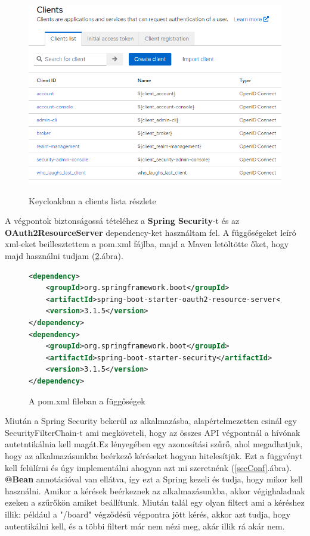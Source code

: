 \documentclass[a4paper,twoside]{article}
\begin{document}
\begin{figure}
	\caption{Keycloakban a clients lista részlete}
	\centering
	\includegraphics[scale=0.5]{keycloak-cients}
	\label{keycloak}
\end{figure}
\FloatBarrier


A végpontok biztonságossá tételéhez a \textbf{Spring Security}-t és az \\ \textbf{OAuth2ResourceServer} dependency-ket használtam fel. A függőségeket leíró xml-eket beillesztettem a pom.xml fájlba, majd a Maven letöltötte őket, hogy majd használni tudjam (\ref{pom}.ábra).
\begin{figure}
	\caption{A pom.xml fileban a függőségek}
	\centering
	\begin{lstlisting}[language=XML,breaklines=true]
<dependency>
	<groupId>org.springframework.boot</groupId>
	<artifactId>spring-boot-starter-oauth2-resource-server</artifactId>
	<version>3.1.5</version>
</dependency>
<dependency>
	<groupId>org.springframework.boot</groupId>
	<artifactId>spring-boot-starter-security</artifactId>
	<version>3.1.5</version>
</dependency>
	\end{lstlisting}
	\label{pom}
\end{figure}
\FloatBarrier


Miután a Spring Security bekerül az alkalmazásba, alapértelmezetten csinál egy SecurityFilterChain-t ami megköveteli, hogy az összes API végpontnál
a hívónak autetntikálnia kell magát.Ez lényegében egy azonosítási szűrő, ahol megadhatjuk, hogy az alkalmazásunkba beérkező kéréseket hogyan hitelesítjük. Ezt a függvényt kell felülírni és úgy implementálni ahogyan azt mi szeretnénk (\ref{secConf}.ábra). \textbf{@Bean} annotációval van ellátva,
így ezt a Spring kezeli és tudja, hogy mikor kell használni. Amikor a kérések beérkeznek az alkalmazásunkba, akkor végighaladnak ezeken a szűrőkön amiket beállítunk. Miután talál 
egy olyan filtert ami a kéréshez illik: például a "/board" végződésű végpontra jött kérés, akkor azt tudja, hogy autentikálni kell, és a többi filtert már nem nézi meg, akár illik rá akár nem. 
\end{document}
